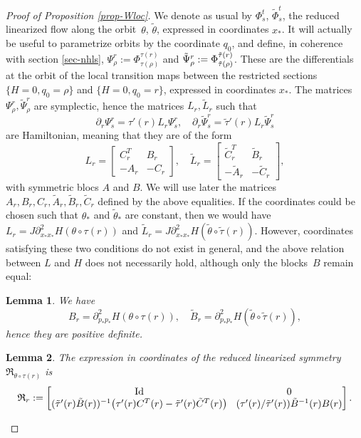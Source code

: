 \documentclass[10pt]{amsart}
\DeclareMathOperator{\Id}{Id}
\newcommand{\gR}{\ensuremath{\mathfrak{R}}}
\theoremstyle{plain}
\newtheorem{lem}{Lemma}
\theoremstyle{definition}
\begin{document}
\begin{proof}[Proof of Proposition \ref{prop-Wloc}]
We denote as usual by $\Phi_s^t$, \resp $\tilde \Phi_s^t$, the reduced linearized flow along the orbit~$\theta$, \resp $\tilde \theta$, expressed in coordinates $x_*$.
It will actually be useful to parametrize orbits by the coordinate $q_0$, and define, in coherence with section \ref{sec-nhls}, $\Psi_{\rho}^r:= \Phi_{\tau(\rho)}^{\tau(r)}$ and
$\tilde \Psi_{\rho}^r:=\nobreak\Phi_{\tilde \tau(\rho)}^{\tilde \tau(r)}$. These are the differentials at the orbit of the local transition maps between the restricted sections $\{H=0, q_0=\rho \}$ and $\{H=0, q_0=r \}$, expressed in coordinates $x_*$.
The matrices $\Psi_{\rho}^r, \tilde \Psi_{\rho}^r$ are symplectic, hence the matrices $L_r, \tilde L_r$ such that
\[
\partial_r \Psi_s^r=\tau'(r)L_r \Psi_s^r, \quad
\partial_r \tilde \Psi_s^r=\tilde \tau'(r)L_r \tilde \Psi_s^r
\]
are Hamiltonian, meaning that they are of the form
\[
L_r=\begin{bmatrix}
C_r^T & B_r\\-A_r &-C _r
\end{bmatrix}
, \quad
\tilde L_r=\begin{bmatrix}
\tilde C_r^T & \tilde B_r\\-\tilde A_r &-\tilde C _r
\end{bmatrix},
\]
with symmetric blocs $A$ and $B$. We will use later the matrices $A_r, B_r, C_r, \tilde A_r, \tilde B_r, \tilde C_r$ defined by the above equalities.
If the coordinates could be chosen such that $\theta_*$ and $\tilde \theta_* $ are constant, then we would have $L_r=J\partial^2_{x_*x_*}H(\theta\circ \tau(r))$ and $\tilde L_r=J\partial^2_{x_*x_*}H(\tilde \theta \circ\tilde \tau(r))$.
However, coordinates satisfying these two conditions do not exist in general, and the above relation between $L$ and $H$ does not necessarily hold,
although only the blocks~$B$ remain equal:

\begin{lem}\label{lem-reduc}
We have
\[
B_r= \partial^2_{p_*p_*}H(\theta\circ \tau(r)), \quad \tilde B_r= \partial^2_{p_*p_*}H(\tilde \theta\circ \tilde \tau(r)),
\]
hence they are positive definite.
\end{lem}

\begin{lem}\label{lem-R}
The expression in coordinates of the reduced linearized symmetry $\gR_{\theta\circ \tau(r)}$ is
\[\arraycolsep4.5pt
\gR_{r}:=
\begin{bmatrix}
\Id&0\\
(\tilde \tau'(r)\tilde B(r))^{-1}\big(\tau'(r)C^T(r)-\tilde \tau'(r) \tilde C^T(r)\big) & (\tau'(r)/\tilde \tau'(r)) \tilde B^{-1}(r) B(r)
\end{bmatrix}.
\]
\end{lem}


\end{proof}
\end{document}
